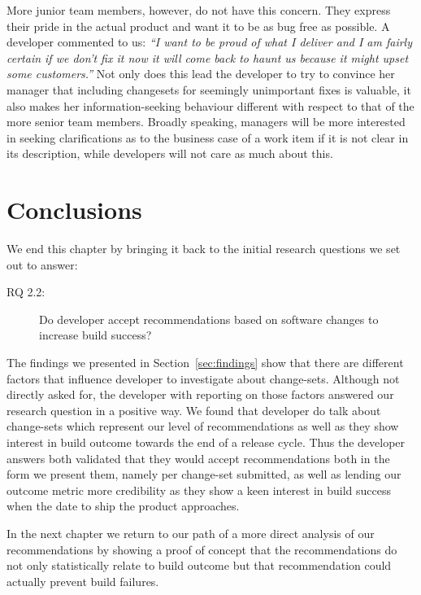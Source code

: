 More junior team members, however, do not have this concern. They express their pride in the actual product and want it to be as bug free as possible. A developer commented to us: \emph{``I want to be proud of what I deliver and I am fairly certain if we don't fix it now it will come back to haunt us because it might upset some customers.''} Not only does this lead the developer to try to convince her manager that including changesets for seemingly unimportant fixes is valuable, it also makes her information-seeking behaviour different with respect to that of the more senior team members. Broadly speaking, managers will be more interested in seeking clarifications as to the business case of a work item if it is not clear in its description, while developers will not care as much about this.


\section{Conclusions}
\label{sec:conclusions}
We end this chapter by bringing it back to the initial research questions we set out to answer:
\begin{description}
  \item[RQ 2.2:] Do developer accept recommendations based on software changes to increase build success? 
\end{description}

The findings we presented in Section~\ref{sec:findings} show that there are different factors that influence developer to investigate about change-sets.
Although not directly asked for, the developer with reporting on those factors answered our research question in a positive way.
We found that developer do talk about change-sets which represent our level of recommendations as well as they show interest in build outcome towards the end of a release cycle.
Thus the developer answers both validated that they would accept recommendations both in the form we present them, namely per change-set submitted, as well as lending our outcome metric more credibility as they show a keen interest in build success when the date to ship the product approaches.

In the next chapter we return to our path of a more direct analysis of our recommendations by showing a proof of concept that the recommendations do not only statistically relate to build outcome but that recommendation could actually prevent build failures.